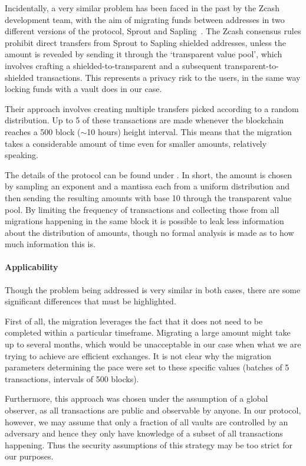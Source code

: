 Incidentally, a very similar problem has been faced in the past by the Zcash development team, with the aim of migrating funds between addresses in two different versions of the protocol, Sprout and Sapling~\cite{SprouttoSaplingMigration,zipszip0308turnstiles}.
The Zcash consensus rules prohibit direct transfers from Sprout to Sapling shielded addresses, unless the amount is revealed by sending it through the `transparent value pool', which involves crafting a shielded-to-transparent and a subsequent transparent-to-shielded transactions.
This represents a privacy risk to the users, in the same way locking funds with a vault does in our case.

Their approach involves creating multiple transfers picked according to a random distribution.
Up to 5 of these transactions are made whenever the blockchain reaches a 500 block ($\sim$10 hours) height interval.
This means that the migration takes a considerable amount of time even for smaller amounts, relatively speaking.

The details of the protocol can be found under \autocite{zipszip0308turnstiles}.
In short, the amount is chosen by sampling an exponent and a mantissa each from a uniform distribution and then sending the resulting amounts with base 10 through the transparent value pool.
By limiting the frequency of transactions and collecting those from all migrations happening in the same block it is possible to leak less information about the distribution of amounts, though no formal analysis is made as to how much information this is.

\paragraph{Applicability}
Though the problem being addressed is very similar in both cases, there are some significant differences that must be highlighted.

First of all, the migration leverages the fact that it does not need to be completed within a particular timeframe.
Migrating a large amount might take up to several months, which would be unacceptable in our case when what we are trying to achieve are efficient exchanges.
It is not clear why the migration parameters determining the pace were set to these specific values (batches of 5 transactions, intervals of 500 blocks).

Furthermore, this approach was chosen under the assumption of a global observer, as all transactions are public and observable by anyone.
In our protocol, however, we may assume that only a fraction of all vaults are controlled by an adversary and hence they only have knowledge of a subset of all transactions happening.
Thus the security assumptions of this strategy may be too strict for our purposes.

